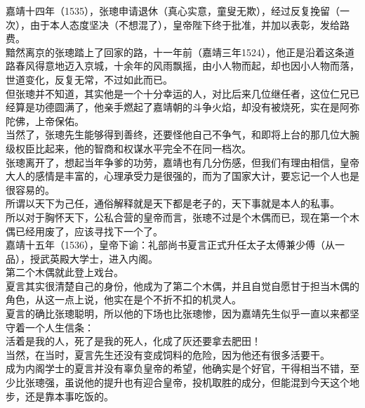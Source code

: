 \begin{multicols}{\theparacolNo}
嘉靖十四年（1535），张璁申请退休（真心实意，童叟无欺），经过反复挽留（一次），由于本人态度坚决（不想混了），皇帝陛下终于批准，并加以表彰，发给路费。\\

黯然离京的张璁踏上了回家的路，十一年前（嘉靖三年1524），他正是沿着这条道路春风得意地迈入京城，十余年的风雨飘摇，由小人物而起，却也因小人物而落，世道变化，反复无常，不过如此而已。\\

但张璁并不知道，其实他是一个十分幸运的人，对比后来几位继任者，这位仁兄已经算是功德圆满了，他亲手燃起了嘉靖朝的斗争火焰，却没有被烧死，实在是阿弥陀佛，上帝保佑。\\

当然了，张璁先生能够得到善终，还要怪他自己不争气，和即将上台的那几位大腕级权臣比起来，他的智商和权谋水平完全不在同一档次。\\

张璁离开了，想起当年争爹的功劳，嘉靖也有几分伤感，但我们有理由相信，皇帝大人的感情是丰富的，心理承受力是很强的，而为了国家大计，要忘记一个人也是很容易的。\\

所谓以天下为己任，通俗解释就是天下都是老子的，天下事就是本人的私事。\\

所以对于胸怀天下，公私合营的皇帝而言，张璁不过是个木偶而已，现在第一个木偶已经用废了，应该寻找下一个了。\\

嘉靖十五年（1536），皇帝下谕：礼部尚书夏言正式升任太子太傅兼少傅（从一品），授武英殿大学士，进入内阁。\\

第二个木偶就此登上戏台。\\

夏言其实很清楚自己的身份，他成为了第二个木偶，并且自觉自愿甘于担当木偶的角色，从这一点上说，他实在是个不折不扣的机灵人。\\

夏言的确比张璁聪明，所以他的下场也比张璁惨，因为嘉靖先生似乎一直以来都坚守着一个人生信条：\\

活着是我的人，死了是我的死人，化成了灰还要拿去肥田！\\

当然，在当时，夏言先生还没有变成饲料的危险，因为他还有很多活要干。\\

成为内阁学士的夏言并没有辜负皇帝的希望，他确实是个好官，干得相当不错，至少比张璁强，虽说他的提升也有迎合皇帝，投机取胜的成分，但能混到今天这个地步，还是靠本事吃饭的。\\


\end{multicols}

